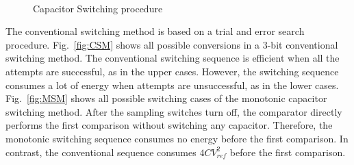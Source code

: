 \begin{figure}[ht]
	\begin{center}
		 \\
		\caption{Capacitor Switching procedure}
		\label{fig:CSP}
	\end{center}
\end{figure}

\par
\hspace{1.2cm} The conventional switching method is based on a trial and error search procedure. Fig.~\ref{fig:CSM} shows all possible conversions in a 3-bit conventional switching method. The conventional switching sequence is efficient when all the attempts are successful, as in the upper cases. However, the switching sequence consumes a lot of energy when attempts are unsuccessful, as in the lower cases. Fig.~\ref{fig:MSM} shows all possible switching cases of the monotonic capacitor switching method. After the sampling switches turn off, the comparator directly performs the first comparison without switching any capacitor. Therefore, the monotonic switching sequence consumes no energy before the first comparison. In contrast, the conventional sequence consumes $4CV^2_{ref}$ before the first comparison.



